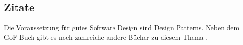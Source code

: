 \begin{appendix}
\section{Zitate}

Die Voraussetzung für gutes Software Design sind Design Patterns.
Neben dem GoF Buch \cite[S. 190]{Gamma95} gibt es noch zahlreiche andere Bücher
zu diesem Thema \cite[S. 999]{Marinescu02} \cite{dpquiz} \cite{Wick2005}.

\end{appendix}
